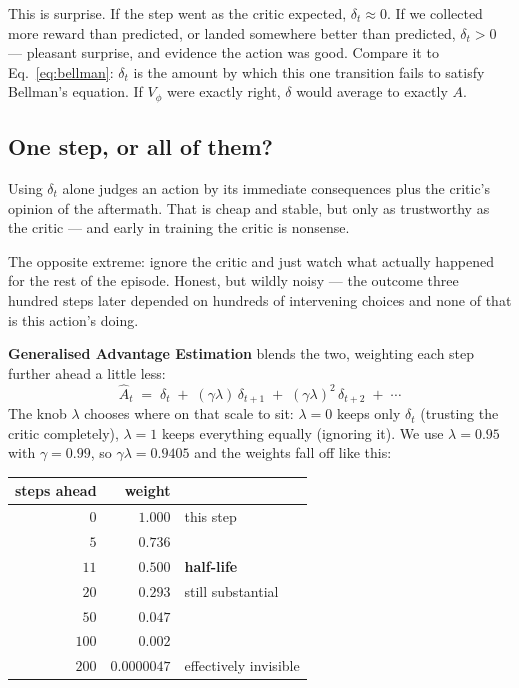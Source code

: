 \documentclass[11pt,a4paper]{article}
\begin{document}
This is surprise. If the step went as the critic expected, $\delta_t \approx 0$. If we
collected more reward than predicted, or landed somewhere better than predicted,
$\delta_t > 0$ --- pleasant surprise, and evidence the action was good. Compare it to
Eq.~\ref{eq:bellman}: $\delta_t$ is the amount by which this one transition fails to satisfy
Bellman's equation. If $V_\phi$ were exactly right, $\delta$ would average to exactly $A$.

\subsection{One step, or all of them?}

Using $\delta_t$ alone judges an action by its immediate consequences plus the critic's
opinion of the aftermath. That is cheap and stable, but only as trustworthy as the critic ---
and early in training the critic is nonsense.

The opposite extreme: ignore the critic and just watch what actually happened for the rest of
the episode. Honest, but wildly noisy --- the outcome three hundred steps later depended on
hundreds of intervening choices and none of that is this action's doing.

\textbf{Generalised Advantage Estimation} blends the two, weighting each step further ahead
a little less:
\begin{equation}
\label{eq:gae}
\hat A_t \;=\; \delta_t \;+\; (\gamma\lambda)\,\delta_{t+1} \;+\; (\gamma\lambda)^2\,\delta_{t+2} \;+\;\cdots
\end{equation}
The knob $\lambda$ chooses where on that scale to sit: $\lambda = 0$ keeps only $\delta_t$
(trusting the critic completely), $\lambda = 1$ keeps everything equally (ignoring it). We
use $\lambda = 0.95$ with $\gamma = 0.99$, so $\gamma\lambda = 0.9405$ and the weights fall
off like this:

\begin{center}
\small
\begin{tabular}{rrl}
\toprule
\textbf{steps ahead} & \textbf{weight} & \\
\midrule
$0$   & $1.000$      & this step \\
$5$   & $0.736$      & \\
$11$  & $0.500$      & \textbf{half-life} \\
$20$  & $0.293$      & still substantial \\
$50$  & $0.047$      & \\
$100$ & $0.002$      & \\
$200$ & $0.0000047$  & effectively invisible \\
\bottomrule
\end{tabular}
\end{center}
\end{document}

